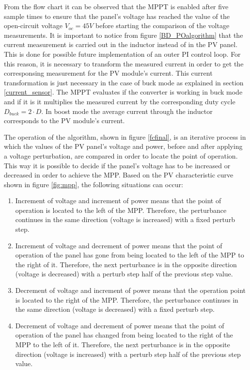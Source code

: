 From the flow chart it can be observed that the MPPT is enabled after five sample times to ensure that the panel's voltage has reached the value of the open-circuit voltage $V_{oc}=45 V$ before starting the comparison of the voltage measurements.
It is important to notice from figure \ref{BD_POalgorithm} that the current measurement is carried out in the inductor instead of in the PV panel. This is done for possible future implementation of an outer PI control loop. For this reason, it is necessary to transform the measured current in order to get the corresponsing measurement for the PV module's current. This current transformation is just necessary in the case of buck mode as explained in section \ref{current_sensor}. The MPPT evaluates if the converter is working in buck mode and if it is it multiplies the measured current by the corresponding duty cycle $D_{buck}=2\cdot D$. In boost mode the average current through the inductor corresponds to the PV module's current. 


The operation of the algorithm, shown in figure \ref{fcfinal}, is an iterative process in which the values of the PV panel's voltage and power, before and after applying a voltage perturbation, are compared  in order to locate the point of operation. This way it is possible to decide if the panel's voltage has to be increased or decreased in order to achieve the MPP. Based on the PV characteristic curve shown in figure \ref{fig:mpp}, the following situations can occur:

\begin{enumerate}
\item Increment of voltage and increment of power means that the point of operation is located to the left of the MPP. Therefore, the perturbance continues in the same direction (voltage is increased) with a fixed perturb step. 
\item Increment of voltage and decrement of power means that the point of operation of the panel has gone from being located to the left of the MPP to the right of it. Therefore, the next perturbance is in the opposite direction (voltage is decreased) with a perturb step half of the previous step value.
\item Decrement of voltage and increment of power means that the operation point is located to the right of the MPP. Therefore, the perturbance continues in the same direction (voltage is decreased) with a fixed perturb step. 
\item Decrement of voltage and decrement of power means that the point of operation of the panel has changed from being located to the right of the MPP to the left of it. Therefore, the next perturbance is in the opposite direction (voltage is increased) with a perturb step half of the previous step value.
\end{enumerate}

